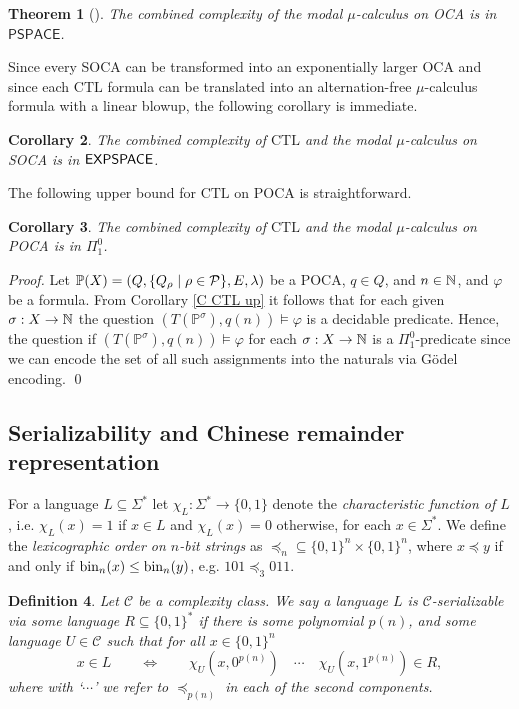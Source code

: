 \documentclass[times,envcountsame]{llncs}
\newtheorem{theorem}{{\bf Theorem}}[section]
\newtheorem{corollary}[theorem]{{\bf Corollary}}
\newtheorem{definition}[theorem]{{\bf Definition}}
\def\PSPACE{{\mathsf{PSPACE}}}
\newcommand{\prop}{\rho}
\newcommand{\Poca}{\mathbb{P}}
\newcommand{\ctl}{\text{CTL}}
\begin{document}
\begin{theorem}[\cite{Serr06}]
The combined complexity of the modal $\mu$-calculus on OCA is in $\PSPACE$.
\end{theorem}

\noindent
Since every SOCA can be transformed into an exponentially larger OCA
 and since each $\ctl$ formula can be translated into an alternation-free
$\mu$-calculus formula with a linear blowup, the following corollary is
immediate.

\begin{corollary}{\label{C CTL up}}
The combined complexity of $\ctl$ and the modal $\mu$-calculus on SOCA is in ${\mathsf{EXPSPACE}}$.
\end{corollary}

\noindent
The following upper bound for $\ctl$ on POCA is straightforward.

\begin{corollary}
The combined complexity of $\ctl$ and the modal $\mu$-calculus on POCA is in $\Pi^0_1$.
\end{corollary}
\begin{proof}
Let $\Poca(X)=(Q,\{Q_\prop\mid\prop\in\Prop\},E,\lambda)$ be a POCA,
 $q\in Q$, and $n\in\mathbb{N}$, and $\varphi$ be
a formula.
From Corollary \ref{C CTL up} it follows that
for each given $\sigma:X\rightarrow\mathbb{N}$ the question
$
(T(\Poca^\sigma),q(n))\models\varphi
$
is a decidable predicate.
Hence, the question if
$
(T(\Poca^\sigma),q(n))\models\varphi
$
for each $\sigma:X\rightarrow\mathbb{N}$ is a $\Pi^0_1$-predicate since
we can encode the set of all such assignments into the naturals
via G\"odel encoding.
\qed
\end{proof}


\subsection{Serializability and Chinese remainder representation}{\label{S Serial}}
For a language $L\subseteq\Sigma^*$ let $\chi_L:\Sigma^*\rightarrow\{0,1\}$
denote the {\em characteristic function of $L$}, i.e.
$\chi_L(x)=1$ if $x\in L$ and $\chi_L(x)=0$ otherwise, for each $x\in\Sigma^*$.
We define the {\em lexicographic
order on $n$-bit strings} as $\preceq_n\subseteq\{0,1\}^n\times\{0,1\}^n$, where
$x\preceq y$ if and only if
$\text{bin}_n(x)\leq\text{bin}_n(y)$, e.g. $101\preceq_3 011$.

\renewcommand{\C}{\mathcal{C}}
\begin{definition}
Let $\C$ be a complexity class.
We say a language $L$ is {\em $\C$-serializable via some language
$R\subseteq\{0,1\}^*$} if there is some polynomial $p(n)$, and some language
$U\in\C$ such that for all $x\in\{0,1\}^n$
$$x\in L\qquad\!\!\iff\qquad\!\!
\chi_U\left(x,0^{p(n)}\right)\quad \cdots\quad \chi_U\left(x,1^{p(n)}\right)\in
R,$$ where with `$\cdots$'  we
refer to $\preceq_{p(n)}$ in each of the second components.
\end{definition}
\end{document}
